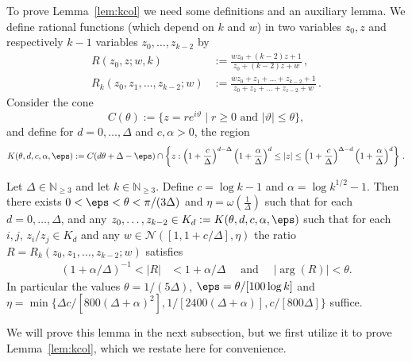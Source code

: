 To prove Lemma~\ref{lem:kcol} we need some definitions and an auxiliary lemma. 
We define rational functions (which depend on $k$ and $w$) in two variables $z_0,z$ and respectively $k-1$ variables $z_0,\ldots,z_{k-2}$ by
\begin{align*}
 R(z_0,z;w,k) &:= \frac{wz_0+(k-2)z+1}{z_0+(k-2)z+w}\,,\\
 R_k(z_0,z_1,\ldots,z_{k-2};w) &:= \frac{wz_0+z_1+\ldots+z_{k-2}+1}{z_0+z_1+\ldots+z_{z-2}+w}\,.
\end{align*}
Consider the cone
\[
C(\theta):=\{z=re^{i\vartheta}\mid r\geq 0 \text{ and } |\vartheta|\leq \theta\},
\]
and define for $d=0,\dotsc,\Delta$ and $c,\alpha> 0$, the region
\[
K(\theta,d,c,\alpha,\eps):=C(d\theta+\Delta-\eps)\cap \left\{z: \left(1+\frac{c}{\Delta}\right)^{d-\Delta}\left(1+\frac{\alpha}{\Delta}\right)^{d}\leq |z|\le\left(1+\frac{c}{\Delta}\right)^{\Delta-d}\left(1+\frac{\alpha}{\Delta}\right)^{d}\right\}\,.
\]
%
%
%
\begin{lemma}
\label{lem:forward invariant}
Let $\Delta\in \mathbb{N}_{\geq 3}$ and let $k\in \mathbb{N}_{\geq 3}$. Define $c=\log k-1$ and $\alpha=\log k^{1/2}-1$. Then there exists $0<\eps<\theta<\pi/(3\Delta)$ and $\eta=\omega(\frac{1}{\Delta})$
such that for each $d=0,\ldots,\Delta$, and any $z_0,\ldots,z_{k-2}\in K_d:=K(\theta,d,c,\alpha,\eps)$ such that for each $i,j$, $z_i/z_j\in K_d$ and any  $w\in \mathcal{N}([1,1+c/\Delta],\eta)$ the ratio $R=R_k(z_0,z_1,\ldots,z_{k-2};w)$ satisfies
\begin{align}
(1+\alpha/\Delta)^{-1}<|R|&< 1+\alpha/\Delta\quad \text{ and }\quad  |\arg(R)|< \theta.\label{eq:ratio bound arg}
\end{align}
In particular the values $\theta = 1/(5 \Delta)$, $\eps = \theta / [100 \log k]$ and $\eta = \min\{\Delta c / [800(\Delta + \alpha)^2], 1/[2400(\Delta+ \alpha)], c / [800 \Delta]\}$ suffice.
\end{lemma}
\noindent
We will prove this lemma in the next subsection, but we first utilize it to prove Lemma~\ref{lem:kcol}, which we restate here for convenience.
%
\zerofreeinduction*
%
